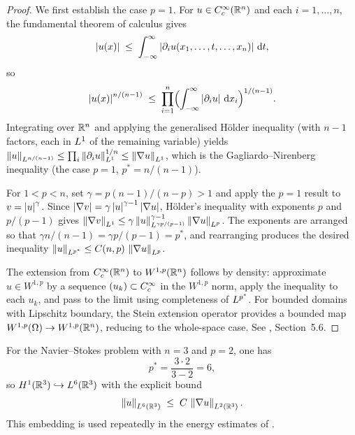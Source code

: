 \begin{proof}
  We first establish the case $p = 1$.  For $u \in C^\infty_c(\mathbb{R}^{n})$ and each
  $i = 1, \ldots, n$, the fundamental theorem of calculus gives
  \[
    \left\lvert u(x) \right\rvert
    \;\le\;
    \int_{-\infty}^{\infty}
    \left\lvert \partial_{i} u(x_{1}, \ldots, t, \ldots, x_{n}) \right\rvert\,\mathrm{d} t,
  \]
  so
  \[
    \left\lvert u(x) \right\rvert^{n/(n-1)}
    \;\le\;
    \prod_{i=1}^{n}
    \Bigl(\int_{-\infty}^{\infty} \left\lvert \partial_{i} u \right\rvert\,\mathrm{d} x_{i}\Bigr)^{1/(n-1)}.
  \]
  Integrating over $\mathbb{R}^{n}$ and applying the generalised H\"{o}lder inequality
  (with $n - 1$ factors, each in $L^{1}$ of the remaining variable) yields
  $\left\lVert u \right\rVert_{L^{n/(n-1)}} \le \prod_{i} \left\lVert \partial_{i} u \right\rVert_{L^{1}}^{1/n}
  \le \left\lVert \nabla u \right\rVert_{L^{1}}$, which is the Gagliardo--Nirenberg inequality
  (the case $p = 1$, $p^{*} = n/(n-1)$).

  For $1 < p < n$, set $\gamma = p(n-1)/(n-p) > 1$ and apply the $p = 1$ result to
  $v = \left\lvert u \right\rvert^{\gamma}$.  Since $\left\lvert \nabla v \right\rvert = \gamma \left\lvert u \right\rvert^{\gamma - 1}
  \left\lvert \nabla u \right\rvert$, H\"{o}lder's inequality with exponents $p$ and $p/(p-1)$ gives
  $\left\lVert \nabla v \right\rVert_{L^{1}} \le \gamma \left\lVert u \right\rVert_{L^{\gamma p/(p-1)}}^{\gamma - 1}
  \left\lVert \nabla u \right\rVert_{L^{p}}$.  The exponents are arranged so that $\gamma n/(n-1)
  = \gamma p/(p-1) = p^{*}$, and rearranging produces the desired inequality
  $\left\lVert u \right\rVert_{L^{p^{*}}} \le C(n,p)\,\left\lVert \nabla u \right\rVert_{L^{p}}$.

  The extension from $C^\infty_c(\mathbb{R}^{n})$ to $W^{1,p}(\mathbb{R}^{n})$ follows by density:
  approximate $u \in W^{1,p}$ by a sequence $(u_{k}) \subset C^\infty_c$ in the $W^{1,p}$
  norm, apply the inequality to each $u_{k}$, and pass to the limit using completeness
  of $L^{p^{*}}$.  For bounded domains with Lipschitz boundary, the Stein extension
  operator provides a bounded map $W^{1,p}(\Omega) \to W^{1,p}(\mathbb{R}^{n})$, reducing to
  the whole-space case.  See \cite{evans2010}, Section~5.6.
\end{proof}

\begin{remark}[The case $n = 3$, $p = 2$]
  For the Navier--Stokes problem with $n = 3$ and $p = 2$, one has
  \[
    p^{*} = \frac{3 \cdot 2}{3 - 2} = 6,
  \]
  so $H^{1}(\mathbb{R}^{3}) \hookrightarrow L^{6}(\mathbb{R}^{3})$ with the explicit bound
  \begin{equation}\label{eq:H1-L6-embedding}
    \left\lVert u \right\rVert_{L^{6}(\mathbb{R}^{3})}
    \;\le\;
    C\,\left\lVert \nabla u \right\rVert_{L^{2}(\mathbb{R}^{3})}.
  \end{equation}
  This embedding is used repeatedly in the energy estimates of .
\end{remark}

